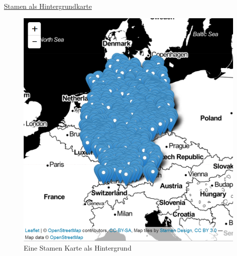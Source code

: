 \documentclass[ignorenonframetext,]{beamer}
\newenvironment{Shaded}{\begin{snugshade}}{\end{snugshade}}
\newcommand{\KeywordTok}[1]{\textcolor[rgb]{0.26,0.66,0.93}{\textbf{#1}}}
\newcommand{\StringTok}[1]{\textcolor[rgb]{0.02,0.61,0.04}{#1}}
\newcommand{\OperatorTok}[1]{\textcolor[rgb]{0.74,0.68,0.62}{#1}}
\newcommand{\NormalTok}[1]{\textcolor[rgb]{0.74,0.68,0.62}{#1}}
\begin{document}
\begin{frame}[fragile]{\href{https://rstudio.github.io/leaflet/basemaps.html}{Stamen
als Hintergrundkarte}}

\begin{Shaded}
\end{Shaded}

\begin{figure}
\centering
\includegraphics{figure/InteractiveStamen.PNG}
\caption{Eine Stamen Karte als Hintergrund}
\end{figure}

\end{frame}
\end{document}
